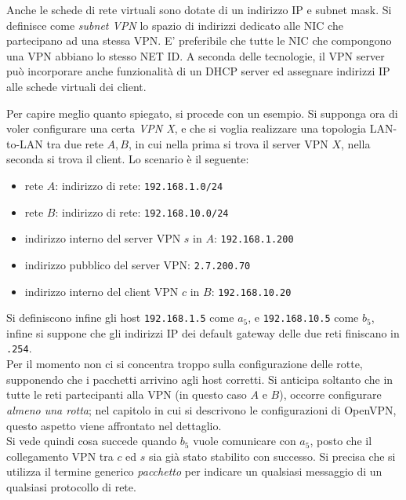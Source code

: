 Anche le schede di rete virtuali sono dotate di un indirizzo IP e subnet mask.
Si definisce come \textit{subnet VPN} lo spazio di indirizzi dedicato alle NIC
che partecipano ad una stessa VPN. E' preferibile che tutte le NIC che compongono
una VPN abbiano lo stesso NET ID. A seconda delle tecnologie, il VPN server
può incorporare anche funzionalità di un DHCP server ed assegnare indirizzi
IP alle schede virtuali dei client.


Per capire meglio quanto spiegato, si procede con un esempio.
Si supponga ora di voler configurare una certa \textit{VPN X}, e che si voglia realizzare una
topologia LAN-to-LAN tra due rete $A, B$, in cui nella prima si trova il server VPN $X$,
nella seconda si trova il client.  Lo scenario è il seguente:
\begin{itemize}
	\item rete $A$: indirizzo di rete: \texttt{192.168.1.0/24}
	\item rete $B$: indirizzo di rete: \texttt{192.168.10.0/24}
	\item indirizzo interno del server VPN $s$ in $A$: \texttt{192.168.1.200}
	\item indirizzo pubblico del server VPN: \texttt{2.7.200.70}
	\item indirizzo interno del client VPN $c$ in $B$: \texttt{192.168.10.20}
\end{itemize}
Si definiscono
infine gli host \texttt{192.168.1.5} come $a_5$, e \texttt{192.168.10.5} come $b_5$, infine
si suppone che gli indirizzi IP
dei default gateway delle due reti finiscano in \texttt{.254}.\\
Per il momento non ci si concentra troppo sulla configurazione delle rotte, supponendo che i
pacchetti arrivino
agli host corretti. Si anticipa soltanto che in tutte le reti partecipanti alla VPN
(in questo caso $A$ e $B$), occorre configurare \textit{almeno una rotta}; nel capitolo in cui si descrivono le configurazioni di OpenVPN,
questo aspetto viene affrontato nel dettaglio.\\
Si vede quindi cosa succede quando $b_5$ vuole comunicare con $a_5$, posto che il
collegamento VPN tra $c$ ed $s$ sia già stato stabilito con successo. Si precisa che
si utilizza il termine generico \textit{pacchetto} per indicare un qualsiasi messaggio
di un qualsiasi protocollo di rete.
